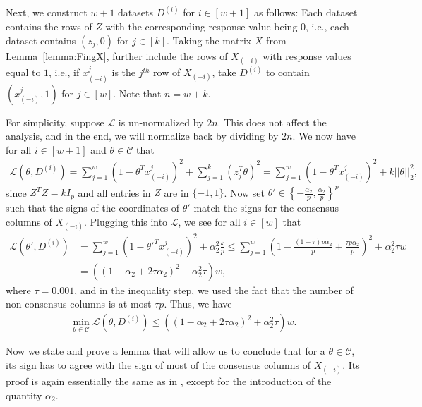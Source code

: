\documentclass{article}
\begin{document}
Next, we construct $w + 1$ datasets $D^{(i)}$ for $i \in [w + 1]$ as follows: Each dataset contains the rows of $Z$ with the corresponding response value being $0$, i.e., each dataset contains $(z_j, 0)$ for $j \in [k]$. Taking the matrix $X$ from Lemma~\ref{lemma:FingX}, further include the rows of $X_{(-i)}$ with response values equal to $1$, i.e., if $x_{(-i)}^{j}$ is the $j^{th}$ row of $X_{(-i)}$, take $D^{(i)}$ to contain $(x_{(-i)}^{j}, 1)$ for $j \in [w]$. Note that $n = w + k$.

For simplicity, suppose $\mathcal{L}$ is un-normalized by $2n$. This does not affect the analysis, and in the end, we will normalize back by dividing by $2n$. We now have for all $i \in [w + 1]$ and $\theta \in \mathcal{C}$ that
\begin{align*}
\mathcal{L}\left(\theta, D^{(i)}\right) = \sum_{j = 1}^w \left(1 - \theta^Tx_{(-i)}^{j}\right)^2 + \sum_{j = 1}^k (z_j^T\theta)^2 = \sum_{j = 1}^w \left(1 - \theta^Tx_{(-i)}^{j}\right)^2 + k||\theta||_2^2,
\end{align*}
since $Z^TZ = kI_p$ and all entries in $Z$ are in $\{-1, 1\}$. Now set $\theta' \in \left\{-\frac{\alpha_2}{p}, \frac{\alpha_2}{p}\right\}^p$ such that the signs of the coordinates of $\theta'$ match the signs for the
consensus columns of $X_{(-i)}$. Plugging this into $\mathcal{L}$, we see for all $i \in [w]$ that
\begin{align*}
\mathcal{L}\left(\theta', D^{(i)}\right) &= \sum_{j = 1}^w \left(1 - \theta'^Tx_{(-i)}^{j}\right)^2 + \alpha_2^2\frac{k}{p} \leq \sum_{j = 1}^w \left(1 - \frac{(1 - \tau) p \alpha_2}{p} + \frac{\tau p \alpha_2}{p}\right)^2 + \alpha_2^2 \tau w\\
&= \left((1 - \alpha_2 + 2\tau \alpha_2)^2 + \alpha_2^2 \tau \right)w,
\end{align*}
where $\tau = 0.001$, and in the inequality step, we used the fact that  the number of non-consensus columns is at most $\tau p$. Thus, we have
\begin{align*}
\mathop{\min}\limits_{\theta \in \mathcal{C}}\mathcal{L}\left(\theta, D^{(i)}\right) \leq \left((1 - \alpha_2 + 2\tau \alpha_2)^2 + \alpha_2^2 \tau \right)w.
\end{align*}

Now we state and prove a lemma that will allow us to conclude that for a $\theta \in \mathcal{C}$, its sign has to agree with the sign of most of the consensus columns of $X_{(-i)}$. Its proof is again essentially the same as in \cite{NOPL}, except for the introduction of the quantity $\alpha_2$.
\end{document}
